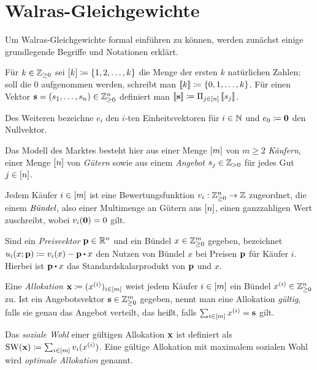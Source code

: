 \section{Walras-Gleichgewichte}\label{sec-walras-equilibria}

Um Walras-Gleichgewichte formal einführen zu können, werden zunächst einige grundlegende Begriffe und Notationen erklärt.

\begin{notation}
	Für $k\in\mathbb{Z}_{\geq 0}$ sei $\left[ k \right]\coloneqq \{ 1, 2, \dots, k \}$ die Menge der ersten $k$ natürlichen Zahlen; soll die $0$ aufgenommen werden, schreibt man $\left\llbracket k \right\rrbracket\coloneqq \{0,1,\dots, k \}$.
	Für einen Vektor $\mathbf{s} = (s_1, \dots, s_n)\in\mathbb{Z}_{\geq0}^n$ definiert man $\left\llbracket \mathbf{s} \right\rrbracket\coloneqq \Pi_{j\in\left[ n \right]} \left\llbracket s_j \right\rrbracket$.
	
	Des Weiteren bezeichne $e_i$ den $i$-ten Einheitsvektoren für $i\in\mathbb{N}$ und $e_0 \coloneqq \mathbf{0}$ den Nullvektor. 
\end{notation}

Das Modell des Marktes besteht hier aus einer Menge $\left[ m \right]$ von $m\geq 2$ \emph{Käufern}, einer Menge $\left[ n \right]$ von \emph{Gütern} sowie aus einem \emph{Angebot} $s_j\in\mathbb{Z}_{>0}$ für jedes Gut $j\in\left[ n \right]$.

Jedem Käufer $i\in\left[ m \right]$ ist eine Bewertungsfunktion $v_i:\mathbb{Z}^n_{\geq 0} \rightarrow \mathbb{Z}$ zugeordnet, die einem $\emph{Bündel}$, also einer Multimenge an Gütern aus $\left[ n \right]$, einen ganzzahligen Wert zuschreibt, wobei $v_i(\mathbf{0}) = 0$ gilt.

Sind ein \emph{Preisvektor} $\mathbf{p}\in\mathbb{R}^n$ und ein Bündel $x\in\mathbb{Z}^{m}_{\geq0}$ gegeben, bezeichnet $u_i(x;\fp) \coloneqq v_i(x) - \fp \bcdot x$ den Nutzen von Bündel $x$ bei Preisen $\mathbf{p}$ für Käufer $i$.
Hierbei ist $\fp \bcdot x$ das Standardskalarprodukt von $\mathbf{p}$ und $x$.

\begin{definition}[Allokation]
	Eine \emph{Allokation} $\mathbf{x}\coloneqq (x^{(i)})_{i\in\left[ m \right]}$ weist jedem Käufer $i\in\left[ m \right]$ ein Bündel $x^{(i)} \in\mathbb{Z}^n_{\geq0}$ zu.
	Ist ein Angebotsvektor $\mathbf{s}\in\mathbb{Z}^m_{\geq0}$ gegeben, nennt man eine Allokation \emph{gültig}, falls sie genau das Angebot verteilt, das heißt, falls $\sum_{i\in\left[ m \right]} x^{(i)} = \mathbf{s}$ gilt.
	
	Das \emph{soziale Wohl} einer gültigen Allokation $\mathbf{x}$ ist definiert als $\operatorname{SW}(\mathbf{x}) \coloneqq \sum_{i\in\left[ m \right]} v_i(x^{(i)})$.
	Eine gültige Allokation mit maximalem sozialen Wohl wird \emph{optimale Allokation} genannt.
\end{definition}

